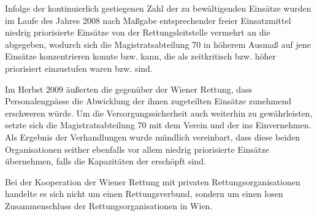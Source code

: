{Infolge der kontinuierlich gestiegenen Zahl der zu
bewältigenden Einsätze wurden im Laufe des Jahres 2008 nach
Maßgabe entsprechender freier Einsatzmittel niedrig
priorisierte Einsätze von der Rettungsleitstelle vermehrt an
die  abgegeben, wodurch sich die
Magistratsabteilung 70 in höherem Ausmaß auf jene Einsätze
konzentrieren konnte bzw. kann, die als zeitkritisch bzw.
höher priorisiert einzustufen waren bzw. sind. 
\citep{KontrollamtWienKA-K-13-09}

Im Herbst 2009 äußerten die  gegenüber der
Wiener Rettung, dass Personalengpässe die Abwicklung der
ihnen zugeteilten Einsätze zunehmend erschweren würde. Um die
Versorgungssicherheit auch weiterhin zu gewährleisten, setzte
sich die Magistratsabteilung 70 mit dem Verein  und der  ins Einvernehmen. Als Ergebnis der Verhandlungen wurde
mündlich vereinbart, dass diese beiden Organisationen seither
ebenfalls vor allem niedrig priorisierte Einsätze übernehmen,
falls die Kapazitäten der  erschöpft sind.
\citep{KontrollamtWienKA-K-13-09}}

Bei der Kooperation der Wiener Rettung mit privaten
Rettungsorganisationen handelte es sich nicht um einen 
Rettungsverbund, sondern um einen losen Zusammenschluss der
Rettungsorganisationen in Wien. 
\citep{KontrollamtWienKA-K-13-09}
{}
{}
{}
{}


\ChapterEnd

